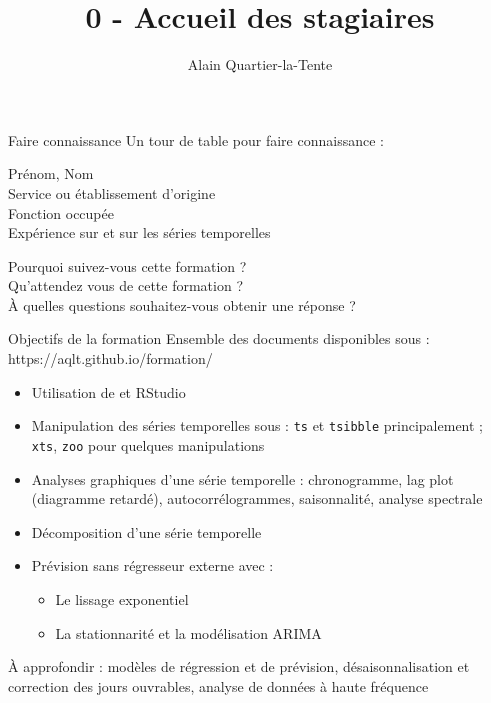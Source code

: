 \documentclass[10pt,french,xcolor=table,color={dvipsnames,usenames},ignorenonframetext,usepdftitle=false,french,handout]{beamer}
\title{0 - Accueil des stagiaires}
\author{Alain Quartier-la-Tente}
\date{}
\begin{document}

\ifdefined\Shaded\renewenvironment{Shaded}{\begin{tcolorbox}[sharp corners, boxrule=0pt, breakable, frame hidden, enhanced, interior hidden, borderline west={3pt}{0pt}{shadecolor}]}{\end{tcolorbox}}\fi

\begin{frame}{Faire connaissance}
\protect\hypertarget{faire-connaissance}{}
Un tour de table pour faire connaissance :

Prénom, Nom\\
Service ou établissement d'origine\\
Fonction occupée\\
Expérience sur  et sur les séries temporelles

Pourquoi suivez-vous cette formation ?\\
Qu'attendez vous de cette formation ?\\
À quelles questions souhaitez-vous obtenir une réponse ?
\end{frame}

\begin{frame}[fragile]{Objectifs de la formation}
\protect\hypertarget{objectifs-de-la-formation}{}
Ensemble des documents disponibles sous :
https://aqlt.github.io/formation/

\begin{itemize}
\item
  Utilisation de  et RStudio
\item
  Manipulation des séries temporelles sous  :
  \texttt{ts} et \texttt{tsibble} principalement ; \texttt{xts},
  \texttt{zoo} pour quelques manipulations
\item
  Analyses graphiques d'une série temporelle : chronogramme, lag plot
  (diagramme retardé), autocorrélogrammes, saisonnalité, analyse
  spectrale
\item
  Décomposition d'une série temporelle
\item
  Prévision sans régresseur externe avec :

  \begin{itemize}
  \item
    Le lissage exponentiel
  \item
    La stationnarité et la modélisation ARIMA
  \end{itemize}
\end{itemize}

\pause

À approfondir : modèles de régression et de prévision,
désaisonnalisation et correction des jours ouvrables, analyse de données
à haute fréquence
\end{frame}
\end{document}

